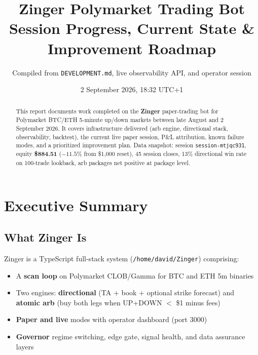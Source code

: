 \documentclass[11pt,a4paper]{article}
\title{\textbf{Zinger Polymarket Trading Bot}\\[0.4em]
\large Session Progress, Current State \& Improvement Roadmap}
\author{Compiled from \texttt{DEVELOPMENT.md}, live observability API, and operator session}
\date{2 September 2026, 18:32 UTC+1}
\begin{document}
\maketitle
\thispagestyle{empty}

\begin{abstract}
\noindent
This report documents work completed on the \textbf{Zinger} paper-trading bot for Polymarket BTC/ETH 5-minute up/down markets between late August and 2 September 2026. It covers infrastructure delivered (arb engine, directional stack, observability, backtest), the current live paper session, P\&L attribution, known failure modes, and a prioritized improvement plan. Data snapshot: session \texttt{session-mtjqc931}, equity \textbf{\$884.51} ($-11.5\%$ from \$1{,}000 reset), 45 session closes, 13\% directional win rate on 100-trade lookback, arb packages net positive at package level.
\end{abstract}

\tableofcontents
\newpage

\section{Executive Summary}

\subsection{What Zinger Is}
Zinger is a TypeScript full-stack system (\texttt{/home/david/Zinger}) comprising:
\begin{itemize}[noitemsep]
  \item A \textbf{scan loop} on Polymarket CLOB/Gamma for BTC and ETH 5m binaries
  \item Two engines: \textbf{directional} (TA + book + optional strike forecast) and \textbf{atomic arb} (buy both legs when UP+DOWN $<$ \$1 minus fees)
  \item \textbf{Paper and live} modes with operator dashboard (port 3000)
  \item \textbf{Governor} regime switching, edge gate, signal health, and data assurance layers
\end{itemize}
\end{document}
